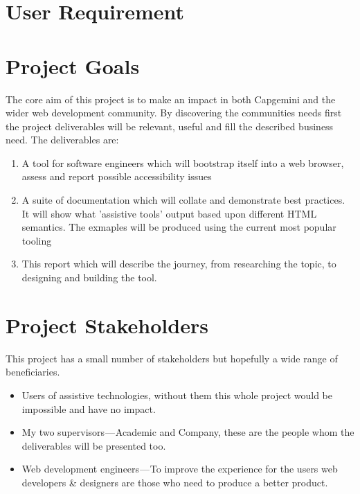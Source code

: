 
\section{User Requirement}


\section{Project Goals}
The core aim of this project is to make an impact in both Capgemini and the
wider web development community. By discovering the communities needs first
the project deliverables will be relevant, useful and fill the described
business need. The deliverables are:
\begin{enumerate}
  \item A tool for software engineers which will bootstrap itself into a web
browser, assess and report possible accessibility issues
  \item A suite of documentation which will collate and demonstrate best
practices. It will show what 'assistive tools' output based upon different
HTML semantics. The exmaples will be produced using the current most popular
tooling
  \item This report which will describe the journey, from researching the
topic, to designing and building the tool.
\end{enumerate}

\section{Project Stakeholders}
This project has a small number of stakeholders but hopefully a wide range of
 beneficiaries.
\begin{itemize}
  \item Users of assistive technologies, without them this whole project would be impossible and have no impact.
  \item My two supervisors — Academic and Company, these are the people whom
  the deliverables will be presented too.
  \item Web development engineers — To improve the experience for the users
  web developers \& designers are those who need to produce a better product.
\end{itemize}

